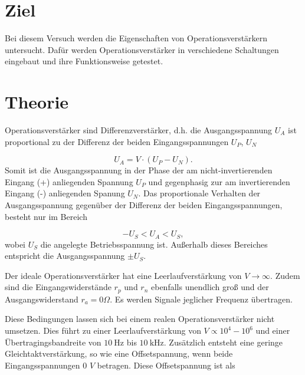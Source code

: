 \section{Ziel}
\label{sec:Ziel}
Bei diesem Versuch werden die Eigenschaften von Operationsverstärkern untersucht. 
Dafür werden Operationsverstärker in verschiedene Schaltungen eingebaut und ihre Funktionsweise getestet.

\section{Theorie}
\label{sec:Theorie}
Operationsverstärker sind Differenzverstärker, d.h. die Ausgangsspannung $U_A$ ist proportional zu der Differenz der beiden Eingangsspannungen $U_P$, $U_N$

\begin{equation*}
    U_A = V \cdot (U_P - U_N).
\end{equation*}
Somit ist die Ausgangsspannung in der Phase der am nicht-invertierenden Eingang (+) anliegenden Spannung $U_P$ und gegenphasig zur am invertierenden Eingang (-) anliegenden Spanung $U_N$.
Das proportionale Verhalten der Ausgangsspannung gegenüber der Differenz der beiden Eingangsspannungen, besteht nur im Bereich 

\begin{equation*}
    -U_S < U_A < U_S,
\end{equation*}
wobei $U_S$ die angelegte Betriebsspannung ist.
Außerhalb dieses Bereiches entspricht die Ausgangsspannung $\pm U_S$.



Der ideale Operationsverstärker hat eine Leerlaufverstärkung von $V \rightarrow \infty$.
Zudem sind die Eingangswiderstände $r_p$ und $r_n$ ebenfalls unendlich groß und der Ausgangswiderstand $r_a = 0 \Omega$.
Es werden Signale jeglicher Frequenz übertragen.

Diese Bedingungen lassen sich bei einem realen Operationsverstärker nicht umsetzen.
Dies führt zu einer Leerlaufverstärkung von $V \propto 10^4 - 10^6$ und einer Übertragingsbandreite von $\SI{10}{\hertz}$ bis $\SI{10}{\kilo\hertz}$.
Zusätzlich entsteht eine geringe Gleichtaktverstärkung, so wie eine Offsetspannung, wenn beide Eingangsspannungen 0 $V$ betragen.
Diese Offsetspannung ist als

